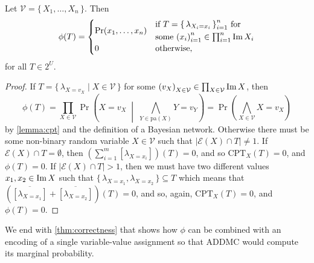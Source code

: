 \begin{lemma}\label{lemma:full_distribution}
  Let $\mathcal{V} = \{\, X_1, \dots, X_n \,\}$. Then
  \[
    \phi(T) =
    \begin{cases}
      \Pr(x_1, \dots, x_n) &
                             \begin{aligned}
                               &\text{if } T = {\{\, \lambda_{X_i=x_i} \,\}}_{i = 1}^n \text{ for} \\
                               &\text{some } \textstyle {(x_i)}_{i=1}^n \in \prod_{i=1}^n \operatorname{Im} X_i
                             \end{aligned} \\
      0 & \text{otherwise,}
    \end{cases}
  \]
  for all $T \in 2^U$.
\end{lemma}
\begin{proof}
  If $T = \{\, \lambda_{X=v_X} \mid X \in \mathcal{V} \,\}$ for some
  ${(v_X)}_{X \in \mathcal{V}} \in \prod_{X \in \mathcal{V}} \operatorname{Im} X$, then
  \[
    \phi(T) = \prod_{X \in \mathcal{V}} \Pr \left( X=v_X \;\middle|\; \bigwedge_{Y \in \mathrm{pa}(X)} Y=v_Y \right) = \Pr \left( \bigwedge_{X \in \mathcal{V}} X=v_X \right)
  \]
  by \cref{lemma:cpt} and the definition of a Bayesian network. Otherwise there
  must be some non-binary random variable $X \in \mathcal{V}$ such that
  $|\mathcal{E}(X) \cap T| \ne 1$. If $\mathcal{E}(X) \cap T = \emptyset$, then
  $\left( \sum_{i=1}^m [\lambda_{X = x_i}] \right)(T) = 0$, and so
  $\mathrm{CPT}_X(T) = 0$, and $\phi(T) = 0$. If $|\mathcal{E}(X) \cap T| > 1$,
  then we must have two different values $x_1, x_2 \in \operatorname{Im} X$ such that
  $\{\, \lambda_{X=x_1}, \lambda_{X=x_2} \,\} \subseteq T$ which means that
  $(\overline{[\lambda_{X=x_1}]} + \overline{[\lambda_{X=x_2}]})(T) = 0$, and
  so, again, $\mathrm{CPT}_X(T) = 0$, and $\phi(T) = 0$.
\end{proof}

We end with \cref{thm:correctness} that shows how $\phi$ can be combined with an
encoding of a single variable-value assignment so that \textsc{ADDMC}
\citep{DBLP:conf/aaai/DudekPV20} would compute its marginal probability.


